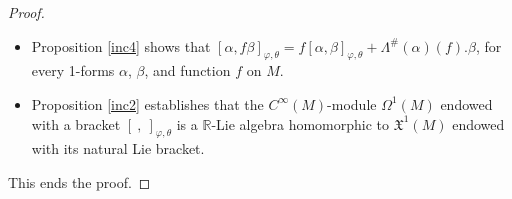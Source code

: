 \documentclass[10pt,a4paper]{amsart}
\begin{document}
\begin{proof}
\begin{itemize}
\begin{align*}
						 0&=i_{X}\Big([df,[dg,dh]_{\varphi,\theta}]_{\varphi,\theta}+[dg,[dh,df]_{\varphi,\theta}]_{\varphi,\theta}+[dh,[df,dg]_{\varphi,\theta}]_{\varphi,\theta} \Big) \\
						&\quad-d\varphi\big((df)^{\#},(dg)^{\#},(dh)^{\#},X\big)+\theta\wedge\varphi\big((df)^{\#},(dg)^{\#},(dh)^{\#},X\big)\\
						 &=i_{X}\Big([df,[dg,dh]_{\varphi,\theta}]_{\varphi,\theta}+[dg,[dh,df]_{\varphi,\theta}]_{\varphi,\theta}+[dh,[df,dg]_{\varphi,\theta}]_{\varphi,\theta} \Big).
					\end{align*}
					This prove the Jacobi identity of $[\ ,\ ]_{\varphi,\theta}$.
					\item  Proposition \ref{inc4} shows  that  $[\alpha,f\beta]_{\varphi,\theta}=f[\alpha,\beta]_{\varphi,\theta}+\Lambda^{\#}(\alpha)(f).\beta $,
					for every  1-forms $\alpha$, $\beta$, and function $f$ on $M$.
					\item  Proposition \ref{inc2}  establishes  that the  $C^\infty(M)$-module $\Omega^1(M)$  endowed with a bracket $[\ ,\ ] _{\varphi,\theta}$
					is a  $\mathbb{R}$-Lie algebra homomorphic to  $\mathfrak{X}^1(M)$ endowed with its natural Lie bracket.
				\end{itemize}
				This ends the proof.
			\end{proof}
\end{document}

